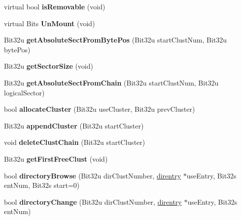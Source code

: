 \begin{DoxyCompactItemize}
\item 
\hypertarget{classfatDrive_a82f0f54ae1d64d62156b03c2f61f347f}{virtual bool {\bfseries is\-Removable} (void)}\label{classfatDrive_a82f0f54ae1d64d62156b03c2f61f347f}

\item 
\hypertarget{classfatDrive_ae4f1277e3b57d312737f2ece5785b2a9}{virtual Bits {\bfseries Un\-Mount} (void)}\label{classfatDrive_ae4f1277e3b57d312737f2ece5785b2a9}

\item 
\hypertarget{classfatDrive_ac865cd5b15f0a72a122783abdb9decbb}{Bit32u {\bfseries get\-Absolute\-Sect\-From\-Byte\-Pos} (Bit32u start\-Clust\-Num, Bit32u byte\-Pos)}\label{classfatDrive_ac865cd5b15f0a72a122783abdb9decbb}

\item 
\hypertarget{classfatDrive_ad2affae0064e689be43f4b081e8ae86b}{Bit32u {\bfseries get\-Sector\-Size} (void)}\label{classfatDrive_ad2affae0064e689be43f4b081e8ae86b}

\item 
\hypertarget{classfatDrive_ab31954a5996df17bbd27e17f4fbc26d6}{Bit32u {\bfseries get\-Absolute\-Sect\-From\-Chain} (Bit32u start\-Clust\-Num, Bit32u logical\-Sector)}\label{classfatDrive_ab31954a5996df17bbd27e17f4fbc26d6}

\item 
\hypertarget{classfatDrive_a77ee4b8cfb4e4fa3f3f63315c827c5aa}{bool {\bfseries allocate\-Cluster} (Bit32u use\-Cluster, Bit32u prev\-Cluster)}\label{classfatDrive_a77ee4b8cfb4e4fa3f3f63315c827c5aa}

\item 
\hypertarget{classfatDrive_a06109e670f9aea5c4dd11d07c50ae240}{Bit32u {\bfseries append\-Cluster} (Bit32u start\-Cluster)}\label{classfatDrive_a06109e670f9aea5c4dd11d07c50ae240}

\item 
\hypertarget{classfatDrive_a87019330262253fb796f8eec8ecccf5e}{void {\bfseries delete\-Clust\-Chain} (Bit32u start\-Cluster)}\label{classfatDrive_a87019330262253fb796f8eec8ecccf5e}

\item 
\hypertarget{classfatDrive_a629d48445667f2662cc360ccaef4b43e}{Bit32u {\bfseries get\-First\-Free\-Clust} (void)}\label{classfatDrive_a629d48445667f2662cc360ccaef4b43e}

\item 
\hypertarget{classfatDrive_accabf68f45861dba60d9c93981c816c4}{bool {\bfseries directory\-Browse} (Bit32u dir\-Clust\-Number, \hyperlink{structdirentry}{direntry} $\ast$use\-Entry, Bit32s ent\-Num, Bit32s start=0)}\label{classfatDrive_accabf68f45861dba60d9c93981c816c4}

\item 
\hypertarget{classfatDrive_a33bfa188995f1f5bf813af5a5b8e24ba}{bool {\bfseries directory\-Change} (Bit32u dir\-Clust\-Number, \hyperlink{structdirentry}{direntry} $\ast$use\-Entry, Bit32s ent\-Num)}\label{classfatDrive_a33bfa188995f1f5bf813af5a5b8e24ba}

\end{DoxyCompactItemize}
